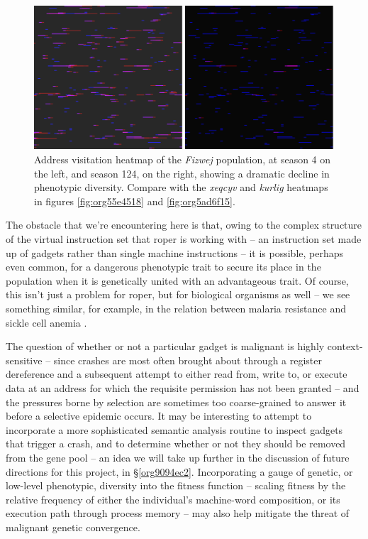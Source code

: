 \documentclass[12pt,glossary]{dalthesis}
\begin{document}
\begin{figure}[htbp]
\centering
\includegraphics[width=.9\linewidth]{../images/plots/fizwej_S124_heatmap.pdf}
\caption{\label{fig:org562c7f9}
Address visitation heatmap of the \emph{Fizwej} population, at season 4 on the left, and season 124, on the right, showing a dramatic decline in phenotypic diversity. Compare with the \emph{xeqcyv} and \emph{kurlig} heatmaps in figures \ref{fig:org55e4518} and \ref{fig:org5ad6f15}.}
\end{figure}

The obstacle that we're encountering here is that, owing to the complex structure
of the virtual instruction set that \gls{roper} is working with -- an instruction set
made up of gadgets rather than single machine instructions -- it is possible, perhaps
even common, for a dangerous phenotypic trait to secure its place in the population
when it is genetically united with an advantageous trait. Of course, this isn't just
a problem for \gls{roper}, but for biological organisms as well -- we see something
similar, for example, in the relation between malaria resistance and sickle cell
anemia \cite{haldane49}.

The question of whether or not a particular gadget is malignant is highly
context-sensitive -- since crashes are most often brought about through a
register dereference and a subsequent attempt to either read from, write to, or
execute data at an address for which the requisite permission has not been
granted -- and the pressures borne by selection are sometimes too coarse-grained
to answer it before a selective epidemic occurs. It may be interesting to
attempt to incorporate a more sophisticated semantic analysis routine to inspect
gadgets that trigger a crash, and to determine whether or not they should be
removed from the gene pool -- an idea we will take up further in the discussion
of future directions for this project, in \S \ref{org9094ec2}. Incorporating
a gauge of genetic, or low-level phenotypic, diversity into the fitness function
-- scaling fitness by the relative frequency of either the individual's
machine-word composition, or its execution path through process memory -- may
also help mitigate the threat of malignant genetic convergence.
\end{document}
